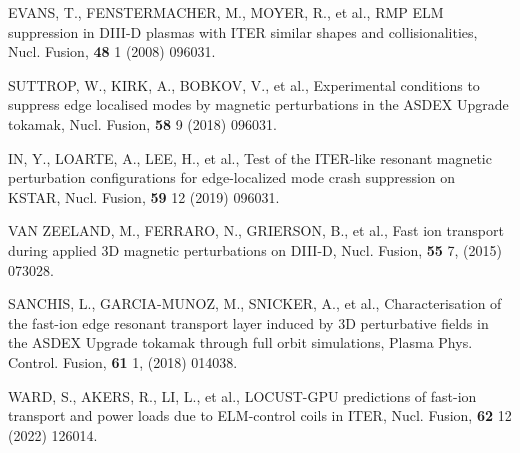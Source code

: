 \documentclass[10pt, a4paper, twoside]{article}
\begin{document}
\begin{thebibliography}{9}

    EVANS, T., FENSTERMACHER, M., MOYER, R., et al.,
    RMP ELM suppression in DIII-D plasmas with ITER similar shapes and collisionalities,
    Nucl. Fusion,
    \textbf{48} 1 
    (2008) 
    096031.

    SUTTROP, W., KIRK, A., BOBKOV, V., et al.,
    Experimental conditions to suppress edge localised modes by magnetic perturbations in the ASDEX Upgrade tokamak,
    Nucl. Fusion,
    \textbf{58} 9 
    (2018) 
    096031.

    IN, Y., LOARTE, A., LEE, H., et al.,
    Test of the ITER-like resonant magnetic perturbation configurations for edge-localized mode crash suppression on KSTAR,
    Nucl. Fusion,
    \textbf{59} 12 
    (2019) 
    096031.
    
    VAN ZEELAND, M., FERRARO, N., GRIERSON, B., et al.,
    Fast ion transport during applied 3D magnetic perturbations on DIII-D,
    Nucl. Fusion,
    \textbf{55} 7,
    (2015)
    073028.

    SANCHIS, L., GARCIA-MUNOZ, M., SNICKER, A., et al.,
    Characterisation of the fast-ion edge resonant transport layer induced by 3D perturbative fields in the ASDEX Upgrade tokamak through full orbit simulations,
    Plasma Phys. Control. Fusion,
    \textbf{61} 1,
    (2018)
    014038.
    
    WARD, S., AKERS, R., LI, L., et al.,
    LOCUST-GPU predictions of fast-ion transport and power loads due to ELM-control coils in ITER,
    Nucl. Fusion,
    \textbf{62} 12
    (2022)
    126014.


\end{thebibliography}
\end{document}
